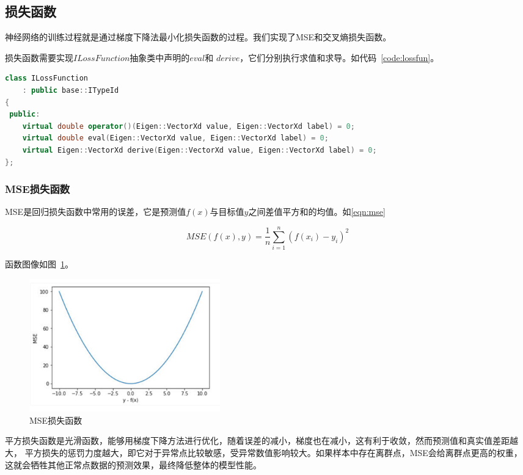 \documentclass[a4paper,twoside,twocolumn]{article}
\begin{document}
\begin{spacing}{1.2}
\subsection{损失函数}
神经网络的训练过程就是通过梯度下降法最小化损失函数的过程。我们实现了MSE和交叉熵损失函数。

损失函数需要实现$ILossFunction$抽象类中声明的$eval$和
$derive$，它们分别执行求值和求导。如代码~\ref{code:lossfun}。

\begin{lstlisting}[language=c++,style=CppStyle,caption={接口$ILossFunction$},label={code:lossfun}]
class ILossFunction
	: public base::ITypeId
{
 public:
	virtual double operator()(Eigen::VectorXd value, Eigen::VectorXd label) = 0;
	virtual double eval(Eigen::VectorXd value, Eigen::VectorXd label) = 0;
	virtual Eigen::VectorXd derive(Eigen::VectorXd value, Eigen::VectorXd label) = 0;
};
\end{lstlisting}

\subsubsection{MSE损失函数}

MSE是回归损失函数中常用的误差，它是预测值$f(x)$与目标值$y$之间差值平方和的均值。如\eqref{eqn:mse}

\begin{equation}
	\label{eqn:mse}
	MSE(f(x), y) = \frac{1}{n} \sum_{i=1}^n (f(x_i) - y_i)^2
\end{equation}

函数图像如图~\ref{fig:mse}。

\begin{figure}[htb]
	\centering
	\caption{MSE损失函数}
	\label{fig:mse}
	\includegraphics[width=0.4\textwidth]{mse.png}
\end{figure}

平方损失函数是光滑函数，能够用梯度下降方法进行优化，随着误差的减小，梯度也在减小，这有利于收敛，然而预测值和真实值差距越大，
平方损失的惩罚力度越大，即它对于异常点比较敏感，受异常数值影响较大。如果样本中存在离群点，MSE会给离群点更高的权重，
这就会牺牲其他正常点数据的预测效果，最终降低整体的模型性能。


\end{spacing}
\end{document}

